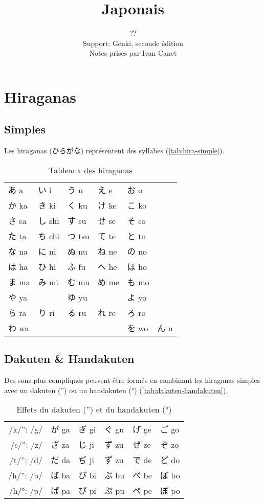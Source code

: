 \documentclass[a4paper,10pt,french,openany]{memoir}
\title{Japonais}
\author{??\\Support: Genki, seconde édition\\Notes prises par Ivan Canet}%
\begin{document}
\maketitle
\tableofcontents

\chapter{Hiraganas}
\section{Simples}

Les hiraganas (ひらがな) représentent des syllabes (\autoref{tab:hira-simple}).

\begin{table}[htbp]
 \centering
 \begin{tabular}{llllll}
  あ a  & い i  & う u  & え e  & お o  &\\
  か ka & き ki & く ku & け ke & こ ko &\\
  さ sa & し shi& す su & せ se & そ so &\\
  た ta & ち chi& つ tsu& て te & と to &\\
  な na & に ni & ぬ nu & ね ne & の no &\\
  は ha & ひ hi & ふ fu & へ he & ほ ho &\\
  ま ma & み mi & む mu & め me & も mo &\\
  や ya & 　    & ゆ yu &　     & よ yo &\\
  ら ra & り ri & る ru & れ re & ろ ro &\\
  わ wa & 　    & 　    & 　    & を wo & ん n\\
 \end{tabular}
 \caption{Tableaux des hiraganas}
 \label{tab:hira-simple}
\end{table}

\section{Dakuten \& Handakuten}

Des sons plus compliqués peuvent être formés en combinant les hiraganas simples avec un dakuten ('') ou un handakuten (°) (\autoref{tab:dakuten-handakuten}).

\begin{table}[htbp]
 \centering
 \begin{tabular}{r|lllll}
  /k/'': /g/ & が ga & ぎ gi & ぐ gu & げ ge & ご go \\
  /s/'': /z/ & ざ za & じ ji & ず zu & ぜ ze & ぞ zo \\
  /t/'': /d/ & だ da & ぢ ji & ず zu & で de & ど do \\
  /h/'': /b/ & ば ba & び bi & ぶ bu & べ be & ぼ bo \\
  /h/°: /p/  & ぱ pa & ぴ pi & ぷ pu & ぺ pe & ぽ po \\
 \end{tabular}
 \caption{Effets du dakuten ('') et du handakuten (°)}
 \label{tab:dakuten-handakuten}
\end{table}
\end{document}
